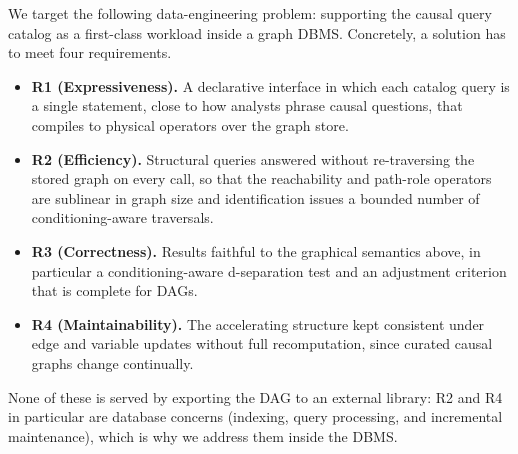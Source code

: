 We target the following data-engineering problem: supporting the causal query
catalog as a first-class workload inside a graph DBMS. Concretely, a solution
has to meet four requirements.
\begin{itemize}
  \item \textbf{R1 (Expressiveness).} A declarative interface in which each
  catalog query is a single statement, close to how analysts phrase causal
  questions, that compiles to physical operators over the graph store.
  \item \textbf{R2 (Efficiency).} Structural queries answered without
  re-traversing the stored graph on every call, so that the reachability and
  path-role operators are sublinear in graph size and identification issues a
  bounded number of conditioning-aware traversals.
  \item \textbf{R3 (Correctness).} Results faithful to the graphical semantics
  above, in particular a conditioning-aware d-separation test and an
  adjustment criterion that is complete for DAGs.
  \item \textbf{R4 (Maintainability).} The accelerating structure kept
  consistent under edge and variable updates without full recomputation, since
  curated causal graphs change continually.
\end{itemize}
None of these is served by exporting the DAG to an external library: R2 and
R4 in particular are database concerns (indexing, query processing, and
incremental maintenance), which is why we address them inside the DBMS.
